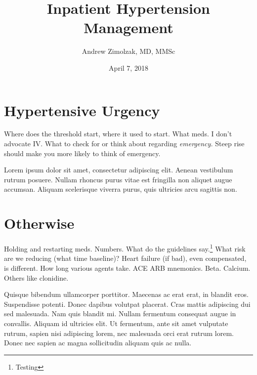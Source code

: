 \documentclass{tufte-handout}
\title{Inpatient Hypertension Management}
\author{Andrew Zimolzak, MD, MMSc}
\date{April 7, 2018}
\begin{document}
\maketitle

\section{Hypertensive Urgency}

Where does the threshold start, where it used to start. What meds. I
don't advocate IV. What to check for or think about regarding
\emph{emergency.} Steep rise should make you more likely to think of
emergency.

Lorem ipsum dolor sit amet, consectetur adipiscing elit. Aenean
vestibulum rutrum posuere. Nullam rhoncus purus vitae est fringilla
non aliquet augue accumsan. Aliquam scelerisque viverra purus, quis
ultricies arcu sagittis non.

\section{Otherwise}

Holding and restarting meds. Numbers. What do the guidelines
say.\footnote{Testing} What risk are we reducing (what time baseline)?
Heart failure (if bad), even compensated, is different.
How long various agents take. ACE ARB mnemonics. Beta. Calcium.
Others like clonidine.

Quisque bibendum ullamcorper porttitor. Maecenas ac erat erat, in
blandit eros. Suspendisse potenti. Donec dapibus volutpat placerat.
Cras mattis adipiscing dui sed malesuada. Nam quis blandit mi. Nullam
fermentum consequat augue in convallis. Aliquam id ultricies elit. Ut
fermentum, ante sit amet vulputate rutrum, sapien nisi adipiscing
lorem, nec malesuada orci erat rutrum lorem. Donec nec sapien ac magna
sollicitudin aliquam quis ac nulla.
\end{document}

